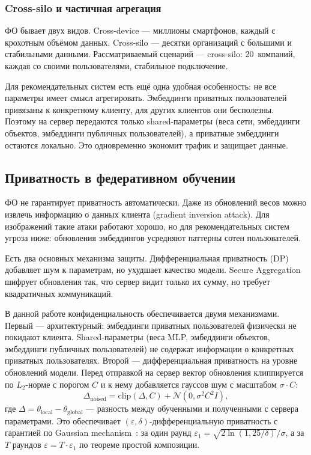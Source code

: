 \documentclass[14pt,a4paper]{extarticle}
\begin{document}
\subsubsection{Cross-silo и частичная агрегация}

ФО бывает двух видов. Cross-device --- миллионы смартфонов, каждый с крохотным объёмом данных. Cross-silo --- десятки организаций с большими и стабильными данными. Рассматриваемый сценарий --- cross-silo: 20~компаний, каждая со своими пользователями, стабильное подключение.

Для рекомендательных систем есть ещё одна удобная особенность: не все параметры имеет смысл агрегировать. Эмбеддинги приватных пользователей привязаны к конкретному клиенту, для других клиентов они бесполезны. Поэтому на сервер передаются только shared-параметры (веса сети, эмбеддинги объектов, эмбеддинги публичных пользователей), а приватные эмбеддинги остаются локально. Это одновременно экономит трафик и защищает данные.


\subsection{Приватность в федеративном обучении}

ФО не гарантирует приватность автоматически. Даже из обновлений весов можно извлечь информацию о данных клиента (gradient inversion attack). Для изображений такие атаки работают хорошо, но для рекомендательных систем угроза ниже: обновления эмбеддингов усредняют паттерны сотен пользователей.

Есть два основных механизма защиты. Дифференциальная приватность (DP) добавляет шум к параметрам, но ухудшает качество модели. Secure Aggregation шифрует обновления так, что сервер видит только их сумму, но требует квадратичных коммуникаций.

В данной работе конфиденциальность обеспечивается двумя механизмами. Первый --- архитектурный: эмбеддинги приватных пользователей физически не покидают клиента. Shared-параметры (веса MLP, эмбеддинги объектов, эмбеддинги публичных пользователей) не содержат информации о конкретных приватных пользователях. Второй --- дифференциальная приватность на уровне обновлений модели. Перед отправкой на сервер вектор обновления клиппируется по $L_2$-норме с порогом $C$ и к нему добавляется гауссов шум с масштабом $\sigma \cdot C$:
\begin{equation}
\Delta_{\text{noised}} = \text{clip}(\Delta, C) + \mathcal{N}(0, \sigma^2 C^2 I),
\end{equation}
где $\Delta = \theta_{\text{local}} - \theta_{\text{global}}$ --- разность между обученными и полученными с сервера параметрами. Это обеспечивает $(\varepsilon, \delta)$-дифференциальную приватность с гарантией по Gaussian mechanism~\cite{dwork2014algorithmic}: за один раунд $\varepsilon_1 = \sqrt{2 \ln(1{,}25/\delta)}/\sigma$, а за $T$ раундов $\varepsilon = T \cdot \varepsilon_1$ по теореме простой композиции.
\end{document}
